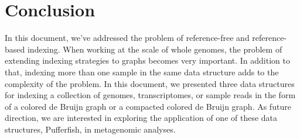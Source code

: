 \chapter{Conclusion}

In this document, we’ve addressed the problem of reference-free and reference-based indexing.
When working at the scale of whole genomes,
the problem of extending indexing strategies to graphs becomes very important.
In addition to that, indexing more than one sample in the same data structure
adds to the complexity of the problem.
In this document, we presented three data structures
for indexing a collection of genomes, transcriptomes, or sample reads
in the form of a colored de Bruijn graph or a compacted colored de Bruijn graph.
As future direction, we are interested in exploring the application
of one of these data structures, Pufferfish, in metagenomic analyses.


